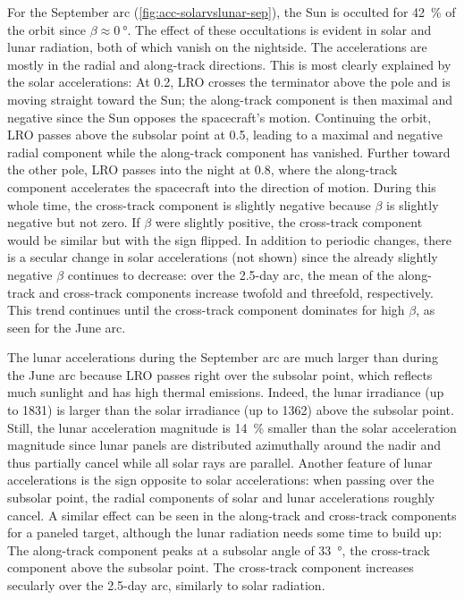 For the September arc (\cref{fig:acc-solarvslunar-sep}), the Sun is occulted for \qty{42}{\percent} of the orbit since $\beta \approx \qty{0}{\degree}$. The effect of these occultations is evident in solar and lunar radiation, both of which vanish on the nightside. The accelerations are mostly in the radial and along-track directions. This is most clearly explained by the solar accelerations: At 0.2, \gls{LRO} crosses the terminator above the pole and is moving straight toward the Sun; the along-track component is then maximal and negative since the Sun opposes the spacecraft's motion. Continuing the orbit, \gls{LRO} passes above the subsolar point at 0.5, leading to a maximal and negative radial component while the along-track component has vanished. Further toward the other pole, \gls{LRO} passes into the night at 0.8, where the along-track component accelerates the spacecraft into the direction of motion. During this whole time, the cross-track component is slightly negative because $\beta$ is slightly negative but not zero. If $\beta$ were slightly positive, the cross-track component would be similar but with the sign flipped. In addition to periodic changes, there is a secular change in solar accelerations (not shown) since the already slightly negative $\beta$ continues to decrease: over the 2.5-day arc, the mean of the along-track and cross-track components increase twofold and threefold, respectively. This trend continues until the cross-track component dominates for high $\beta$, as seen for the June arc.

The lunar accelerations during the September arc are much larger than during the June arc because \gls{LRO} passes right over the subsolar point, which reflects much sunlight and has high thermal emissions. Indeed, the lunar irradiance (up to \qty{1831}{\irr}) is larger than the solar irradiance (up to \qty{1362}{\irr}) above the subsolar point. Still, the lunar acceleration magnitude is \qty{14}{\percent} smaller than the solar acceleration magnitude since lunar panels are distributed azimuthally around the nadir and thus partially cancel while all solar rays are parallel. Another feature of lunar accelerations is the sign opposite to solar accelerations: when passing over the subsolar point, the radial components of solar and lunar accelerations roughly cancel. A similar effect can be seen in the along-track and cross-track components for a paneled target, although the lunar radiation needs some time to build up: The along-track component peaks at a subsolar angle of \qty{33}{\degree}, the cross-track component above the subsolar point. The cross-track component increases secularly over the 2.5-day arc, similarly to solar radiation.

